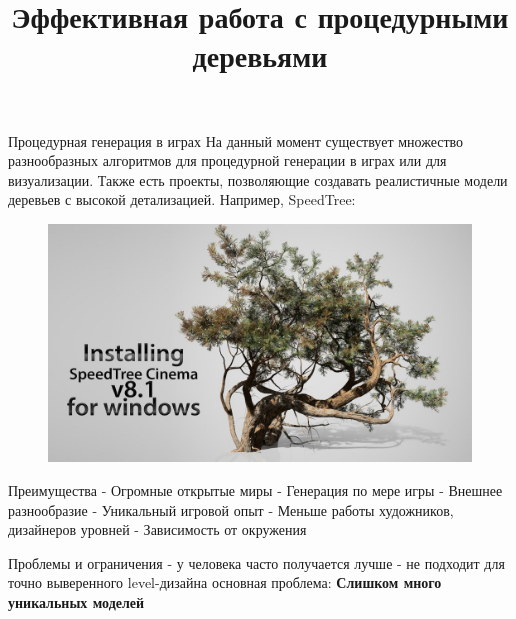 \documentclass[11pt]{beamer}
\title{Эффективная работа с процедурными деревьями}
\begin{document}
\begin{frame}
\titlepage
\end{frame}


\begin{frame}{Процедурная генерация в играх}
На данный момент существует множество разнообразных алгоритмов
для процедурной генерации в играх или для визуализации.
Также есть проекты, позволяющие создавать реалистичные модели
деревьев с высокой детализацией.
Например, SpeedTree: %
\begin{figure}[hbtp]
\centering
\includegraphics[scale=0.2]{st.jpg}
\end{figure}
\end{frame}
\begin{frame}{Преимущества}
- Огромные открытые миры\linebreak
- Генерация по мере игры\linebreak
- Внешнее разнообразие\linebreak
- Уникальный игровой опыт\linebreak
- Меньше работы художников, дизайнеров уровней\linebreak
- Зависимость от окружения
\end{frame}
\begin{frame}{Проблемы и ограничения}
- у человека часто получается лучше\linebreak
- не подходит для точно выверенного level-дизайна\linebreak\linebreak
основная проблема:\linebreak
\textbf{   Слишком много уникальных моделей   }

\end{frame}
\end{document}
